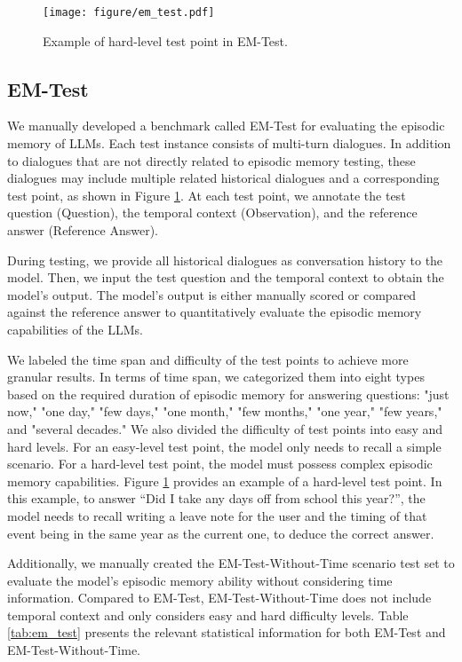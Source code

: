 \begin{figure}[h]
\centering

\texttt{[image: figure/em\_test.pdf]} \\

\caption{Example of hard-level test point in EM-Test.}
\label{fig:em_test}
\vspace{-8mm}
\end{figure}

\subsection{EM-Test}

We manually developed a benchmark called EM-Test for evaluating the episodic memory of LLMs. Each test instance consists of multi-turn dialogues. In addition to dialogues that are not directly related to episodic memory testing, these dialogues may include multiple related historical dialogues and a corresponding test point, as shown in Figure \ref{fig:em_test}. At each test point, we annotate the test question (Question), the temporal context (Observation), and the reference answer (Reference Answer).

During testing, we provide all historical dialogues as conversation history to the model. Then, we input the test question and the temporal context to obtain the model's output. The model's output is either manually scored or compared against the reference answer to quantitatively evaluate the episodic memory capabilities of the LLMs.

We labeled the time span and difficulty of the test points to achieve more granular results. In terms of time span, we categorized them into eight types based on the required duration of episodic memory for answering questions: "just now," "one day," "few days," "one month," "few months," "one year," "few years," and "several decades." We also divided the difficulty of test points into easy and hard levels. For an easy-level test point, the model only needs to recall a simple scenario. For a hard-level test point, the model must possess complex episodic memory capabilities. Figure \ref{fig:em_test} provides an example of a hard-level test point. In this example, to answer “Did I take any days off from school this year?”, the model needs to recall writing a leave note for the user and the timing of that event being in the same year as the current one, to deduce the correct answer.

Additionally, we manually created the EM-Test-Without-Time scenario test set to evaluate the model's episodic memory ability without considering time information. Compared to EM-Test, EM-Test-Without-Time does not include temporal context and only considers easy and hard difficulty levels. Table \ref{tab:em_test} presents the relevant statistical information for both EM-Test and EM-Test-Without-Time.


